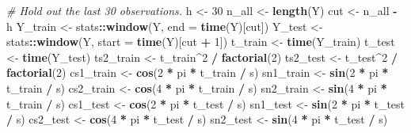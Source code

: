 \documentclass[
  10pt,
]{extarticle}
\newenvironment{Shaded}{\begin{snugshade}}{\end{snugshade}}
\newcommand{\AttributeTok}[1]{\textcolor[rgb]{0.13,0.29,0.53}{#1}}
\newcommand{\CommentTok}[1]{\textcolor[rgb]{0.56,0.35,0.01}{\textit{#1}}}
\newcommand{\DecValTok}[1]{\textcolor[rgb]{0.00,0.00,0.81}{#1}}
\newcommand{\FunctionTok}[1]{\textcolor[rgb]{0.13,0.29,0.53}{\textbf{#1}}}
\newcommand{\NormalTok}[1]{#1}
\newcommand{\OtherTok}[1]{\textcolor[rgb]{0.56,0.35,0.01}{#1}}
\newcommand{\SpecialCharTok}[1]{\textcolor[rgb]{0.81,0.36,0.00}{\textbf{#1}}}
\begin{document}
\begin{Shaded}
\begin{Highlighting}[]
\CommentTok{\# Hold out the last 30 observations.}
\NormalTok{h     }\OtherTok{\textless{}{-}} \DecValTok{30}
\NormalTok{n\_all }\OtherTok{\textless{}{-}} \FunctionTok{length}\NormalTok{(Y)}
\NormalTok{cut   }\OtherTok{\textless{}{-}}\NormalTok{ n\_all }\SpecialCharTok{{-}}\NormalTok{ h}
\NormalTok{Y\_train   }\OtherTok{\textless{}{-}}\NormalTok{ stats}\SpecialCharTok{::}\FunctionTok{window}\NormalTok{(Y, }\AttributeTok{end =} \FunctionTok{time}\NormalTok{(Y)[cut])}
\NormalTok{Y\_test    }\OtherTok{\textless{}{-}}\NormalTok{ stats}\SpecialCharTok{::}\FunctionTok{window}\NormalTok{(Y, }\AttributeTok{start =} \FunctionTok{time}\NormalTok{(Y)[cut }\SpecialCharTok{+} \DecValTok{1}\NormalTok{])}
\NormalTok{t\_train   }\OtherTok{\textless{}{-}} \FunctionTok{time}\NormalTok{(Y\_train)}
\NormalTok{t\_test    }\OtherTok{\textless{}{-}} \FunctionTok{time}\NormalTok{(Y\_test)}
\NormalTok{ts2\_train }\OtherTok{\textless{}{-}}\NormalTok{ t\_train}\SpecialCharTok{\^{}}\DecValTok{2} \SpecialCharTok{/} \FunctionTok{factorial}\NormalTok{(}\DecValTok{2}\NormalTok{)}
\NormalTok{ts2\_test  }\OtherTok{\textless{}{-}}\NormalTok{ t\_test}\SpecialCharTok{\^{}}\DecValTok{2} \SpecialCharTok{/} \FunctionTok{factorial}\NormalTok{(}\DecValTok{2}\NormalTok{)}
\NormalTok{cs1\_train }\OtherTok{\textless{}{-}} \FunctionTok{cos}\NormalTok{(}\DecValTok{2} \SpecialCharTok{*}\NormalTok{ pi }\SpecialCharTok{*}\NormalTok{ t\_train }\SpecialCharTok{/}\NormalTok{ s)}
\NormalTok{sn1\_train }\OtherTok{\textless{}{-}} \FunctionTok{sin}\NormalTok{(}\DecValTok{2} \SpecialCharTok{*}\NormalTok{ pi }\SpecialCharTok{*}\NormalTok{ t\_train }\SpecialCharTok{/}\NormalTok{ s)}
\NormalTok{cs2\_train }\OtherTok{\textless{}{-}} \FunctionTok{cos}\NormalTok{(}\DecValTok{4} \SpecialCharTok{*}\NormalTok{ pi }\SpecialCharTok{*}\NormalTok{ t\_train }\SpecialCharTok{/}\NormalTok{ s)}
\NormalTok{sn2\_train }\OtherTok{\textless{}{-}} \FunctionTok{sin}\NormalTok{(}\DecValTok{4} \SpecialCharTok{*}\NormalTok{ pi }\SpecialCharTok{*}\NormalTok{ t\_train }\SpecialCharTok{/}\NormalTok{ s)}
\NormalTok{cs1\_test  }\OtherTok{\textless{}{-}} \FunctionTok{cos}\NormalTok{(}\DecValTok{2} \SpecialCharTok{*}\NormalTok{ pi }\SpecialCharTok{*}\NormalTok{ t\_test }\SpecialCharTok{/}\NormalTok{ s)}
\NormalTok{sn1\_test  }\OtherTok{\textless{}{-}} \FunctionTok{sin}\NormalTok{(}\DecValTok{2} \SpecialCharTok{*}\NormalTok{ pi }\SpecialCharTok{*}\NormalTok{ t\_test }\SpecialCharTok{/}\NormalTok{ s)}
\NormalTok{cs2\_test  }\OtherTok{\textless{}{-}} \FunctionTok{cos}\NormalTok{(}\DecValTok{4} \SpecialCharTok{*}\NormalTok{ pi }\SpecialCharTok{*}\NormalTok{ t\_test }\SpecialCharTok{/}\NormalTok{ s)}
\NormalTok{sn2\_test  }\OtherTok{\textless{}{-}} \FunctionTok{sin}\NormalTok{(}\DecValTok{4} \SpecialCharTok{*}\NormalTok{ pi }\SpecialCharTok{*}\NormalTok{ t\_test }\SpecialCharTok{/}\NormalTok{ s)}


\end{Highlighting}
\end{Shaded}
\end{document}
